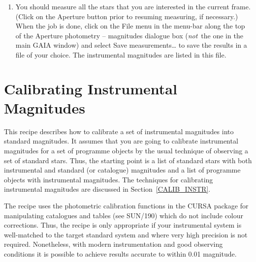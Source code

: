 \documentclass[twoside,11pt]{article}
\newcommand{\xref}[3]{#1}
\newcommand{\xlabel}[1]{}
\begin{document}
\begin{enumerate}
  \item You should measure all the stars that you are interested in
   the current frame.  (Click on the {\sf Aperture} button prior to
   resuming measuring, if necessary.)  When the job is done, click on the
   {\sf File} menu in the menu-bar along the top of the {\sf Aperture
   photometry -- magnitudes} dialogue box ({\it not}\, the one in the
   main GAIA window) and select {\sf Save measurements\ldots} to save the
   results in a file of your choice.  The instrumental magnitudes are
   listed in this file.

\end{enumerate}


\newpage
\section{\xlabel{CALIBRATE_RECIP}\label{CALIBRATE_RECIP}Calibrating
Instrumental Magnitudes}

This recipe describes how to calibrate a set of instrumental magnitudes
into standard magnitudes.  It assumes that you are going to calibrate
instrumental magnitudes for a set of programme objects by the usual
technique of observing a set of standard stars.  Thus, the starting
point is a list of standard stars with both instrumental and
standard (or catalogue) magnitudes and a list of programme objects
with instrumental magnitudes.  The techniques for calibrating
instrumental magnitudes are discussed in Section~\ref{CALIB_INSTR}.

The recipe uses the photometric calibration functions in the CURSA
package for manipulating catalogues and tables (see
\xref{SUN/190}{sun190}{}\cite{SUN190}) which do not include colour
corrections.  Thus, the recipe is only appropriate if your instrumental
system is well-matched to the target standard system and where very high
precision is not required.  Nonetheless, with modern instrumentation and
good observing conditions it is possible to achieve results accurate to
within 0.01 magnitude.
\end{document}
